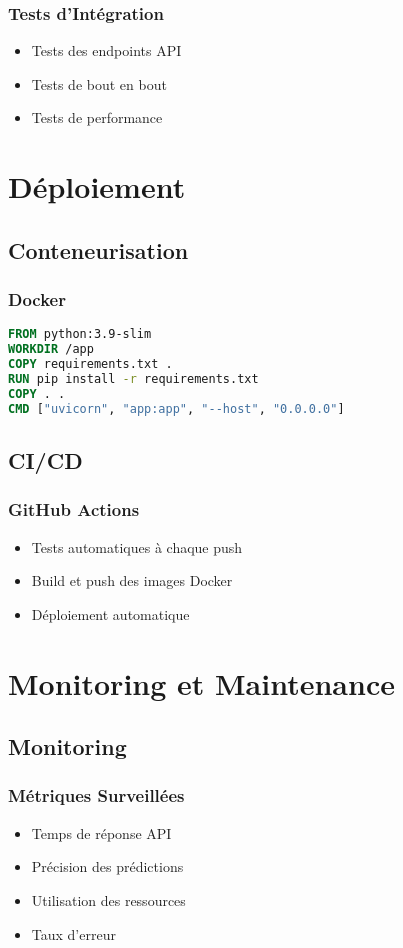 \documentclass[12pt,a4paper]{report}
\begin{document}
\subsection{Tests d'Intégration}
\begin{itemize}
    \item Tests des endpoints API
    \item Tests de bout en bout
    \item Tests de performance
\end{itemize}

\chapter{Déploiement}
\section{Conteneurisation}
\subsection{Docker}
\begin{lstlisting}[language=dockerfile]
FROM python:3.9-slim
WORKDIR /app
COPY requirements.txt .
RUN pip install -r requirements.txt
COPY . .
CMD ["uvicorn", "app:app", "--host", "0.0.0.0"]
\end{lstlisting}

\section{CI/CD}
\subsection{GitHub Actions}
\begin{itemize}
    \item Tests automatiques à chaque push
    \item Build et push des images Docker
    \item Déploiement automatique
\end{itemize}

\chapter{Monitoring et Maintenance}
\section{Monitoring}
\subsection{Métriques Surveillées}
\begin{itemize}
    \item Temps de réponse API
    \item Précision des prédictions
    \item Utilisation des ressources
    \item Taux d'erreur
\end{itemize}
\end{document}
